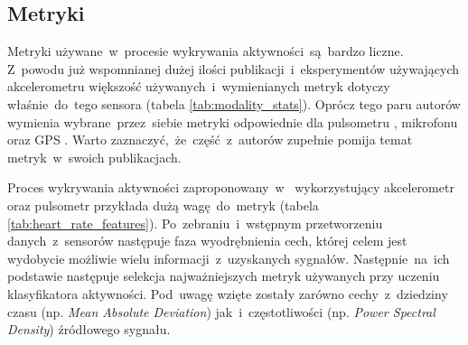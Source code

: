 \subsection{Metryki}
Metryki używane~w~procesie wykrywania aktywności~są~bardzo liczne. Z~powodu już wspomnianej dużej ilości publikacji~i~eksperymentów używających akcelerometru większość używanych~i~wymienianych metryk dotyczy właśnie~do~tego sensora (tabela \ref{tab:modality_stats}). Oprócz tego paru autorów wymienia wybrane~przez~siebie metryki odpowiednie dla pulsometru \cite{S04}, mikrofonu \cite{S22, S46} oraz GPS \cite{S26}. Warto zaznaczyć,~że~część~z~autorów zupełnie pomija temat metryk~w~swoich publikacjach.


Proces wykrywania aktywności zaproponowany~w~\cite{S04} wykorzystujący akcelerometr oraz pulsometr przykłada dużą wagę~do~metryk (tabela \ref{tab:heart_rate_features}). Po~zebraniu~i~wstępnym przetworzeniu danych~z~sensorów następuje faza wyodrębnienia cech, której celem jest wydobycie możliwie wielu informacji~z~uzyskanych sygnałów. Następnie~na~ich podstawie następuje selekcja najważniejszych metryk używanych przy uczeniu klasyfikatora aktywności. Pod~uwagę wzięte zostały zarówno cechy~z~dziedziny czasu (np. {\it Mean Absolute Deviation}) jak~i~częstotliwości (np. {\it Power Spectral Density}) źródłowego sygnału.


